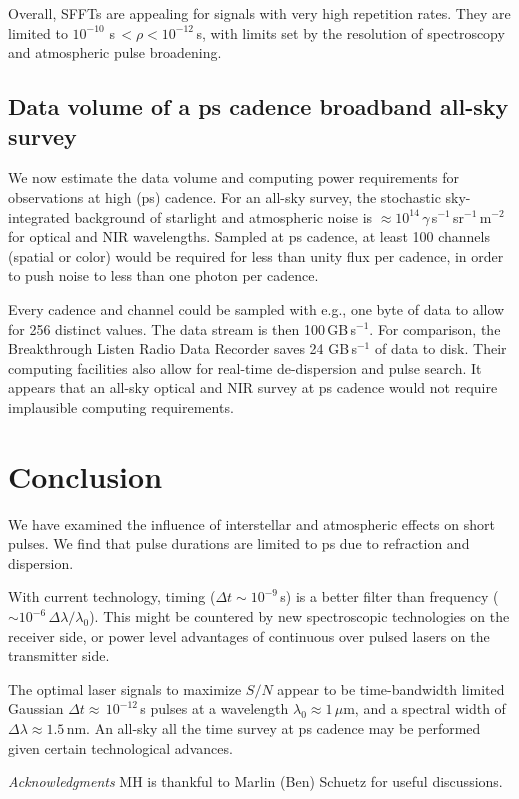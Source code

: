 \documentclass[twocolumn,tighten,longauthor]{myaastex62}
\begin{document}
Overall, SFFTs are appealing for signals with very high repetition rates. They are limited to $10^{-10}\,$\,s$\,<\rho<10^{-12}\,$s, with limits set by the resolution of spectroscopy and atmospheric pulse broadening.


\subsection{Data volume of a ps cadence broadband all-sky survey}
We now estimate the data volume and computing power requirements for observations at high (ps) cadence. For an all-sky survey, the stochastic sky-integrated background of starlight and atmospheric noise is $\approx10^{14}\,\gamma\,$s$^{-1}$\,sr$^{-1}$\,m$^{-2}$ for optical and NIR wavelengths. Sampled at ps cadence, at least 100 channels (spatial or color) would be required for less than unity flux per cadence, in order to push noise to less than one photon per cadence.

Every cadence and channel could be sampled with e.g., one byte of data to allow for 256 distinct values. The data stream is then 100\,GB\,s$^{-1}$. For comparison, the Breakthrough Listen Radio Data Recorder \citep{2018PASP..130d4502M} saves 24 GB\,s$^{-1}$ of data to disk. Their computing facilities also allow for real-time de-dispersion and pulse search. It appears that an all-sky optical and NIR survey at ps cadence would not require implausible computing requirements.


\section{Conclusion}
We have examined the influence of interstellar and atmospheric effects on short pulses. We find that pulse durations are limited to ps due to refraction and dispersion.

With current technology, timing ($\Delta t \sim 10^{-9}\,$s) is a better filter than frequency ($\sim 10^{-6}\,\Delta \lambda / \lambda_0$). This might be countered by new spectroscopic technologies on the receiver side, or power level advantages of continuous over pulsed lasers on the transmitter side.

The optimal laser signals to maximize $S/N$ appear to be time-bandwidth limited Gaussian $\Delta t \approx\,10^{-12}$\,s pulses at a wavelength $\lambda_{0}\approx1\,\mu$m, and a spectral width of $\Delta \lambda \approx 1.5\,$nm. An all-sky all the time survey at ps cadence may be performed given certain technological advances.

\acknowledgments
\textit{Acknowledgments}
MH is thankful to Marlin (Ben) Schuetz for useful discussions.


\end{document}
